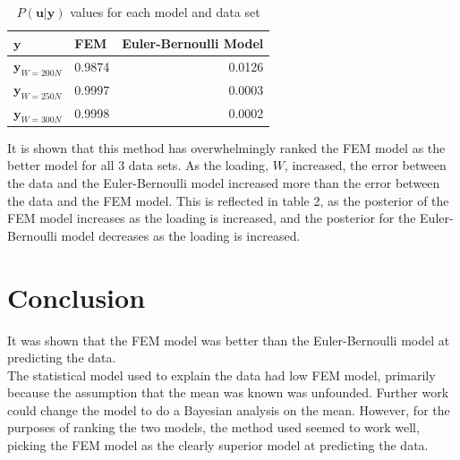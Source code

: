 \documentclass{article}
\begin{document}
\begin{table}[H]
	\centering
	\begin{tabular}{llr}  
		\toprule
		$\boldsymbol{y}$& FEM & Euler-Bernoulli Model \\
		\midrule
		$\boldsymbol{y}_{W = 200N}$ & 0.9874 & 0.0126\\
		$\boldsymbol{y}_{W = 250N}$ & 0.9997& 0.0003\\
		$\boldsymbol{y}_{W = 300N}$ & 0.9998& 0.0002\\
		\bottomrule
	\end{tabular}
	\caption{$P(\boldsymbol{u}|\boldsymbol{y})$ values for each model and data set}
\end{table}

It is shown that this method has overwhelmingly ranked the FEM model as the better model for all 3 data sets. As the loading, $W$, increased, the error between the data and the Euler-Bernoulli model increased more than the error between the data and the FEM model. This is reflected in table 2, as the posterior of the FEM model increases as the loading is increased, and the posterior for the Euler-Bernoulli model decreases as the loading is increased.

\section{Conclusion}
It was shown that the FEM model was better than the Euler-Bernoulli model at predicting the data.\\
The statistical model used to explain the data had low FEM model, primarily because the assumption that the mean was known was unfounded. Further work could change the model to do a Bayesian analysis on the mean. However, for the purposes of ranking the two models, the method used seemed to work well, picking the FEM model as the clearly superior model at predicting the data.


  
\end{document}
